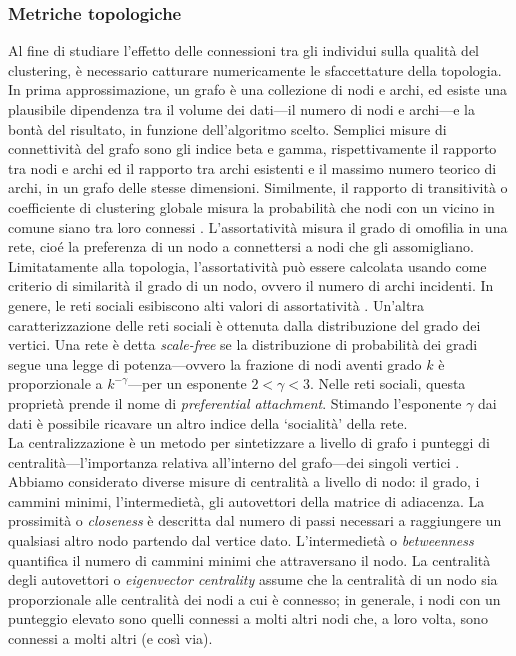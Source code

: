 \subsubsection{Metriche topologiche}
Al fine di studiare l'effetto delle connessioni tra gli individui sulla qualit\`a del clustering, \`e necessario catturare numericamente le sfaccettature della topologia. In prima approssimazione, un grafo \`e una collezione di nodi e archi, ed esiste una plausibile dipendenza tra il volume dei dati---il numero di nodi e archi---e la bont\`a del risultato, in funzione dell'algoritmo scelto.
Semplici misure di connettivit\`a del grafo sono gli indice beta e gamma, rispettivamente il rapporto tra nodi e archi ed il rapporto tra archi esistenti e il massimo numero teorico di archi, in un grafo delle stesse dimensioni. Similmente, il rapporto di transitivit\`a o coefficiente di clustering globale misura la probabilit\`a che nodi con un vicino in comune siano tra loro connessi \cite{wasserman1994social}.
L'assortativit\`a misura il grado di omofilia in una rete, cio\'e la preferenza di un nodo a connettersi a nodi che gli assomigliano. Limitatamente alla topologia, l'assortativit\`a pu\`o essere calcolata usando come criterio di similarit\`a il grado di un nodo, ovvero il numero di archi incidenti. In genere, le reti sociali esibiscono alti valori di assortativit\`a \cite{newman03social,newman02}. Un'altra caratterizzazione delle reti sociali \`e ottenuta dalla distribuzione del grado dei vertici. Una rete \`e detta \textit{scale-free} se la distribuzione di probabilit\`a dei gradi segue una legge di potenza---ovvero la frazione di nodi aventi grado $k$ \`e proporzionale a $k^{-\gamma}$---per un esponente $2<\gamma<3$. Nelle reti sociali, questa propriet\`a prende il nome di \textit{preferential attachment}\cite{Barabasi99emergenceScaling}. Stimando l'esponente $\gamma$ dai dati \`e possibile ricavare un altro indice della `socialit\`a' della rete.\\
La centralizzazione \`e un metodo per sintetizzare a livello di grafo i punteggi di centralit\`a---l'importanza relativa all'interno del grafo---dei singoli vertici \cite{freeman1979centrality,wasserman1994social}. Abbiamo considerato diverse misure di centralit\`a a livello di nodo: il grado, i cammini minimi, l'intermediet\`a, gli autovettori della matrice di adiacenza. La prossimit\`a o \textit{closeness} \`e descritta dal numero di passi necessari a raggiungere un qualsiasi altro nodo partendo dal vertice dato. L'intermediet\`a o \textit{betweenness} quantifica il numero di cammini minimi che attraversano il nodo. La centralit\`a degli autovettori o \textit{eigenvector centrality} \cite{bonacich1987power} assume che la centralit\`a di un nodo sia proporzionale alle centralit\`a dei nodi a cui \`e connesso; in generale, i nodi con un punteggio elevato sono quelli connessi a molti altri nodi che, a loro volta, sono connessi a molti altri (e cos\`i via).\\

